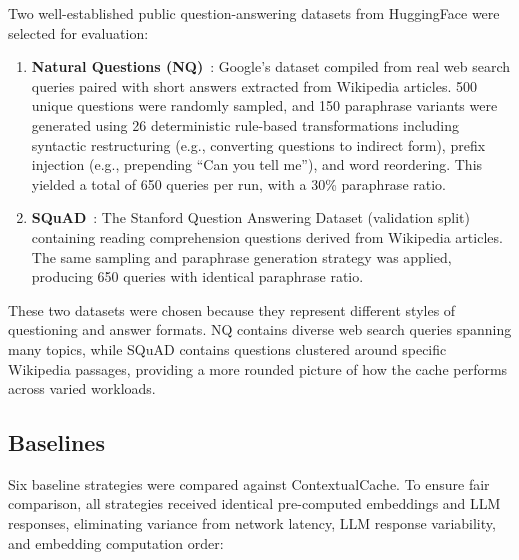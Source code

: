 \documentclass[conference]{IEEEtran}
\begin{document}
Two well-established public question-answering datasets from HuggingFace were selected for evaluation:

\begin{enumerate}[leftmargin=*]
\item \textbf{Natural Questions (NQ)}~\cite{kwiatkowski2019}: Google's dataset compiled from real web search queries paired with short answers extracted from Wikipedia articles. 500 unique questions were randomly sampled, and 150 paraphrase variants were generated using 26 deterministic rule-based transformations including syntactic restructuring (e.g., converting questions to indirect form), prefix injection (e.g., prepending ``Can you tell me''), and word reordering. This yielded a total of 650 queries per run, with a 30\% paraphrase ratio.

\item \textbf{SQuAD}~\cite{rajpurkar2016}: The Stanford Question Answering Dataset (validation split) containing reading comprehension questions derived from Wikipedia articles. The same sampling and paraphrase generation strategy was applied, producing 650 queries with identical paraphrase ratio.
\end{enumerate}

These two datasets were chosen because they represent different styles of questioning and answer formats. NQ contains diverse web search queries spanning many topics, while SQuAD contains questions clustered around specific Wikipedia passages, providing a more rounded picture of how the cache performs across varied workloads.

\subsection{Baselines}

Six baseline strategies were compared against ContextualCache. To ensure fair comparison, all strategies received identical pre-computed embeddings and LLM responses, eliminating variance from network latency, LLM response variability, and embedding computation order:
\end{document}
